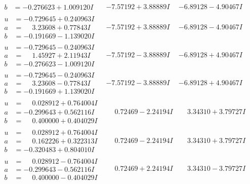 \documentclass[1p]{elsarticle_modified}
\theoremstyle{definition}
\begin{document}
$$\begin{array}{c|c|c}
\begin{aligned}
b &= -0.276623 + 1.009120 I\end{aligned}
 & -7.57192 + 3.88889 I & -6.89128 - 4.90467 I \\ \hline\begin{aligned}
u &= -0.729645 + 0.240963 I \\
a &= \phantom{-}3.23608 + 0.77843 I \\
b &= -0.191669 - 1.139020 I\end{aligned}
 & -7.57192 + 3.88889 I & -6.89128 - 4.90467 I \\ \hline\begin{aligned}
u &= -0.729645 - 0.240963 I \\
a &= \phantom{-}1.45927 + 2.11943 I \\
b &= -0.276623 - 1.009120 I\end{aligned}
 & -7.57192 - 3.88889 I & -6.89128 + 4.90467 I \\ \hline\begin{aligned}
u &= -0.729645 - 0.240963 I \\
a &= \phantom{-}3.23608 - 0.77843 I \\
b &= -0.191669 + 1.139020 I\end{aligned}
 & -7.57192 - 3.88889 I & -6.89128 + 4.90467 I \\ \hline\begin{aligned}
u &= \phantom{-}0.028912 + 0.764004 I \\
a &= -0.299643 + 0.562116 I \\
b &= \phantom{-}0.400000 + 0.404029 I\end{aligned}
 & \phantom{-}0.72469 - 2.24194 I & \phantom{-}3.34310 + 3.79727 I \\ \hline\begin{aligned}
u &= \phantom{-}0.028912 + 0.764004 I \\
a &= \phantom{-}0.162226 + 0.322313 I \\
b &= -0.320483 + 0.804010 I\end{aligned}
 & \phantom{-}0.72469 - 2.24194 I & \phantom{-}3.34310 + 3.79727 I \\ \hline\begin{aligned}
u &= \phantom{-}0.028912 - 0.764004 I \\
a &= -0.299643 - 0.562116 I \\
b &= \phantom{-}0.400000 - 0.404029 I\end{aligned}
 & \phantom{-}0.72469 + 2.24194 I & \phantom{-}3.34310 - 3.79727 I \\ \hline\begin{aligned}

\end{aligned}
\end{array}$$
\end{document}
